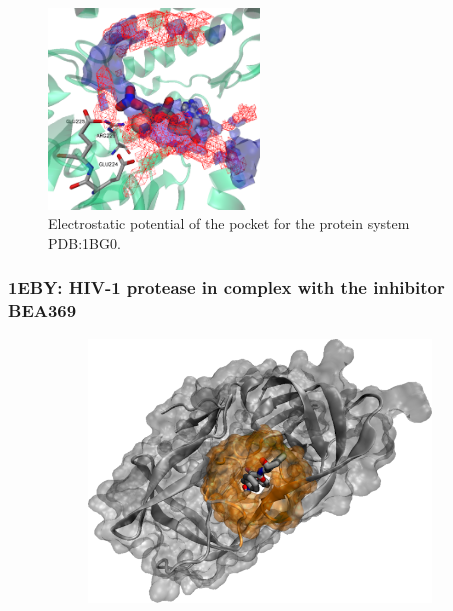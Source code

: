       \begin{figure}[H]
        \centering
        \includegraphics[width=0.5\textwidth]{figures/results/benchmark_prot/1bg0.png}
        \caption{\label{fig:benchmark/1bg0} Electrostatic potential of the pocket for the protein system PDB:1BG0.}
      \end{figure}
    \pagebreak

    \subsubsection{1EBY: HIV-1 protease in complex with the inhibitor BEA369}
      \begin{figure}[H] \centering
        \begin{subfigure}[c]{0.3\textwidth} \centering
          \includegraphics[width=1\textwidth]{figures/results/ps_prot/1eby.png}
        \end{subfigure}
        \begin{subfigure}[c]{0.3\textwidth} \centering
        \end{subfigure}
      \end{figure}

